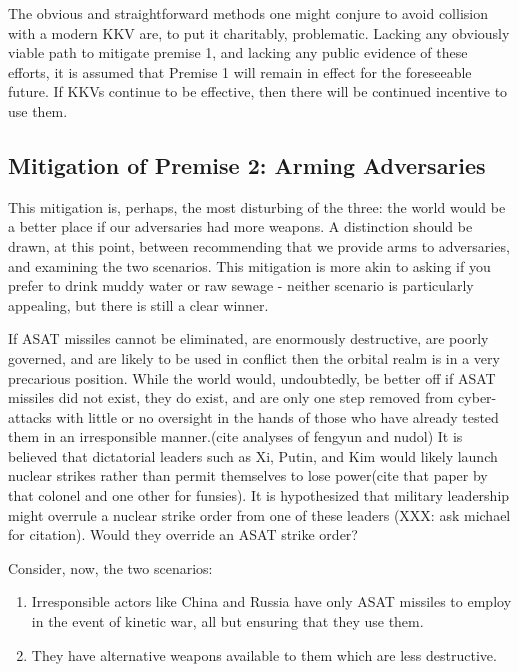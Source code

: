 The obvious and straightforward methods one might conjure to avoid
collision with a modern KKV are, to put it charitably, problematic.
Lacking any obviously viable path to mitigate premise 1, and lacking
any public evidence of these efforts, it is assumed that Premise 1
will remain in effect for the foreseeable future.  If KKVs continue to
be effective, then there will be continued incentive to use them.

\subsection{Mitigation of Premise 2: Arming Adversaries}
This mitigation is, perhaps, the most disturbing of the three: the
world would be a better place if our adversaries had more weapons.  A
distinction should be drawn, at this point, between recommending that
we provide arms to adversaries, and examining the two scenarios.  This
mitigation is more akin to asking if you prefer to drink muddy water
or raw sewage - neither scenario is particularly appealing, but there
is still a clear winner.

If ASAT missiles cannot be eliminated, are enormously destructive, are
poorly governed, and are likely to be used in conflict then the
orbital realm is in a very precarious position.  While the world
would, undoubtedly, be better off if ASAT missiles did not exist, they
do exist, and are only one step removed from cyber-attacks with little
or no oversight in the hands of those who have already tested them in
an irresponsible manner.(cite analyses of fengyun and nudol) It is
believed that dictatorial leaders such as Xi, Putin, and Kim would
likely launch nuclear strikes rather than permit themselves to lose
power(cite that paper by that colonel and one other for funsies).  It
is hypothesized that military leadership might overrule a nuclear
strike order from one of these leaders (XXX: ask michael for
citation).  Would they override an ASAT strike order?

Consider, now, the two scenarios:

\begin{enumerate}
\item Irresponsible actors like China and Russia have only ASAT
  missiles to employ in the event of kinetic war, all but ensuring
  that they use them.

\item They have alternative weapons available to them which are less
  destructive.
\end{enumerate}

